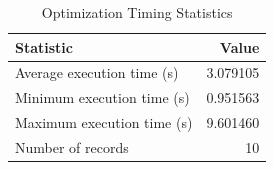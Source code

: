 
\begin{table}[h!]
\centering
\begin{tabular}{l r}
\hline
Statistic & Value \\
\hline
Average execution time (s) & 3.079105 \\
Minimum execution time (s) & 0.951563 \\
Maximum execution time (s) & 9.601460 \\
Number of records & 10 \\
\hline
\end{tabular}
\caption{Optimization Timing Statistics}
\end{table}
